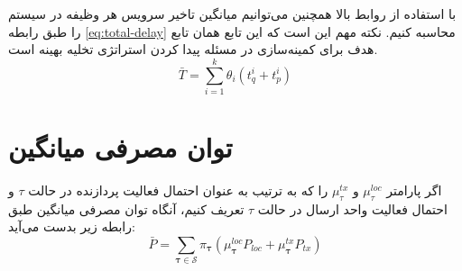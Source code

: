 با استفاده از روابط بالا همچنین می‌توانیم میانگین تاخیر سرویس هر وظیفه در سیستم را طبق رابطه \ref{eq:total-delay} محاسبه کنیم. نکته مهم این است که این تابع همان تابع هدف برای کمینه‌سازی در مسئله پیدا کردن استراتژی تخلیه بهینه است.
\begin{equation}
	\label{eq:total-delay}
	\bar{T}=\sum_{i=1}^{k} \theta_{i}\left(t_{q}^{i}+t_{p}^{i}\right)
\end{equation}
\newpage
\section{توان مصرفی میانگین}
اگر پارامتر
$\mu_\tau^{loc}$
و 
$\mu_\tau^{tx}$
را که به ترتیب به عنوان احتمال فعالیت پردازنده در حالت
$\tau$
و احتمال فعالیت واحد ارسال در حالت
$\tau$
تعریف کنیم، آنگاه توان مصرفی میانگین طبق رابطه زیر بدست می‌آید:
\begin{equation}
	\bar{P}=\sum_{\boldsymbol{\tau} \in \mathcal{S}} \pi_{\boldsymbol{\tau}}\left(\mu_{\boldsymbol{\tau}}^{l o c} P_{l o c}+\mu_{\boldsymbol{\tau}}^{t x} P_{t x}\right)
\end{equation}

